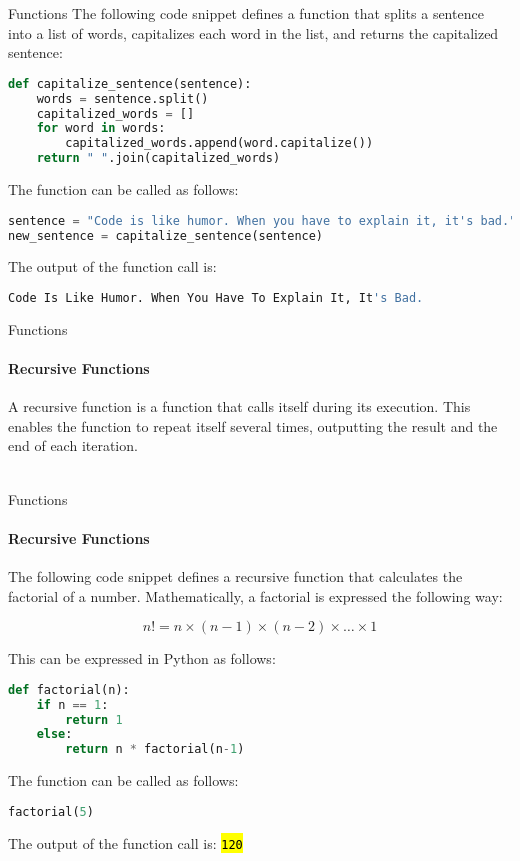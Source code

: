\documentclass[
    aspectratio=169, 
    usepdftitle=false, 
    xcolor={dvipsnames},
    hyperref={
        colorlinks,
        linkcolor=black,
        urlcolor=blue}
    ]{beamer}
\let\OldTexttt\texttt
\renewcommand{\texttt}[1]{\OldTexttt{\hl{#1}}}%
\begin{document}
\begin{frame}[fragile]{Functions}
    The following code snippet defines a function that splits a sentence into a list of words, capitalizes each word in the list, and returns the capitalized sentence:

    \begin{lstlisting}[language=Python]
def capitalize_sentence(sentence):
    words = sentence.split()
    capitalized_words = []
    for word in words:
        capitalized_words.append(word.capitalize())
    return " ".join(capitalized_words)
    \end{lstlisting}

    The function can be called as follows:

    \begin{lstlisting}[language=Python]
sentence = "Code is like humor. When you have to explain it, it's bad."
new_sentence = capitalize_sentence(sentence)
    \end{lstlisting}

    The output of the function call is:

    \begin{lstlisting}[language=Python]
Code Is Like Humor. When You Have To Explain It, It's Bad.
    \end{lstlisting}
\end{frame}

\begin{frame}[fragile]{Functions}
    \framesubtitle{Recursive Functions}
    A recursive function is a function that calls itself during its execution. This enables the function to repeat itself several times, outputting the result and the end of each iteration.\\~\



\end{frame}

\begin{frame}[fragile]{Functions}
    \framesubtitle{Recursive Functions}

    The following code snippet defines a recursive function that calculates the factorial of a number. Mathematically, a factorial is expressed the following way: 

    \begin{equation*}
        n! = n \times (n-1) \times (n-2) \times \dots \times 1
    \end{equation*}

    This can be expressed in Python as follows:

    \begin{lstlisting}[language=Python]
def factorial(n):
    if n == 1:
        return 1
    else:
        return n * factorial(n-1)
    \end{lstlisting}

    The function can be called as follows:

    \begin{lstlisting}[language=Python]
factorial(5)
    \end{lstlisting}

    The output of the function call is: \texttt{120}
\end{frame}
\end{document}
